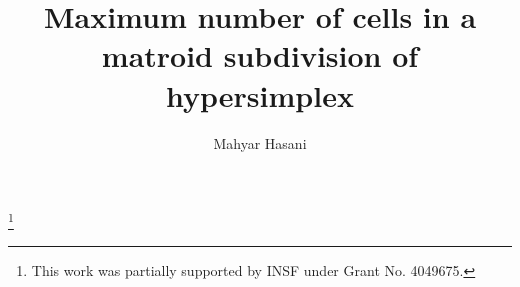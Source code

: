 \documentclass[12pt, reqno]{amsart}
\theoremstyle{definition}
\theoremstyle{remark}
\numberwithin{equation}{section}
\begin{document}
\setcounter{page}{1}

%


\centerline{}

\centerline{}



\title[]{Maximum number of  cells in a matroid subdivision of hypersimplex }

\author[]{ Mahyar Hasani}



\footnote{This work was partially supported by INSF under Grant No. 4049675.}







\address{$^{3}$ Department of Mathematics, IPM - Institute for Research in Fundamental Sciences, Tehran, Iran}
\email{\textcolor[rgb]{0.00,0.00,0.84}{mahyarhasani@ipm.ir}}


%
%
\end{document}
